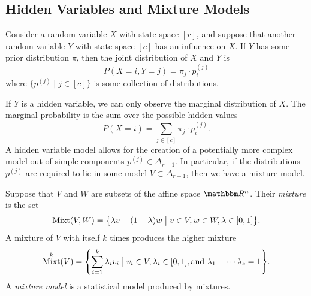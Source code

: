 \documentclass[11pt,titlepage]{article}
\newcommand*{\vbar}{\;\big\vert\;}
\DeclareMathOperator{\Mixt}{Mixt}
\begin{document}
\subsection{Hidden Variables and Mixture Models}
    Consider a random variable $X$ with state space $[r]$, and suppose that
    another random variable $Y$ with state space $[c]$ has an influence on $X$.
    If $Y$ has some prior distribution $\pi$, then the joint distribution of $X$
    and $Y$ is 
    \[
        P(X = i, Y = j) = \pi_j \cdot p_i^{(j)}
    \]
    where $\{p^{(j)} \mid j \in [c]\}$ is some collection of distributions.

    If $Y$ is a hidden variable, we can only observe the marginal distribution
    of $X$.  The marginal probability is the sum over the possible hidden values
    \[
        P(X = i) = \sum_{j \in [c]} \pi_j \cdot p_i^{(j)}.
    \]
    A hidden variable model allows for the creation of a potentially more
    complex model out of simple components $p^{(j)} \in \Delta_{r-1}$.
    In particular, if the distributions $p^{(j)}$ are required to lie in some
    model $V \subset \Delta_{r-1}$, then we have a mixture model.
    \begin{definition}
    Suppose that $V$ and $W$ are subsets of the affine space $\R^n$.  Their
    \emph{mixture} is the set
    \[
        \Mixt(V, W) = \cdil[\big]{
        \lambda v + (1 - \lambda)w \vbar
        v \in V, w \in W, \lambda \in [0,1]
        }.
    \]
    A mixture of $V$ with itself $k$ times produces the higher mixture
    \[
        \Mixt^k(V) = \cdil*{
        \sum_{i=1}^k \lambda_i v_i \vbar v_i \in V, \lambda_i \in [0,1],
        \text{and }\lambda_1 + \cdots \lambda_s = 1
        }.
    \]
    A \emph{mixture model} is a statistical model produced by mixtures.
    \end{definition}
\end{document}
